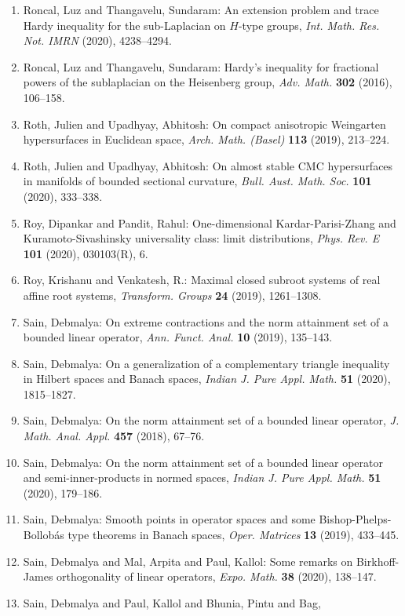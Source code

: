 \begin{enumerate}
\item Roncal, Luz and Thangavelu, Sundaram: An extension problem and trace {H}ardy inequality for the
sub-{L}aplacian on {$H$}-type groups, \emph{Int. Math. Res. Not. IMRN} {\bf } (2020), 4238--4294.
\item Roncal, Luz and Thangavelu, Sundaram: Hardy's inequality for fractional powers of the sublaplacian
on the {H}eisenberg group, \emph{Adv. Math.} {\bf 302} (2016), 106--158.
\item Roth, Julien and Upadhyay, Abhitosh: On compact anisotropic {W}eingarten hypersurfaces in
{E}uclidean space, \emph{Arch. Math. (Basel)} {\bf 113} (2019), 213--224.
\item Roth, Julien and Upadhyay, Abhitosh: On almost stable {CMC} hypersurfaces in manifolds of bounded
sectional curvature, \emph{Bull. Aust. Math. Soc.} {\bf 101} (2020), 333--338.
\item Roy, Dipankar and Pandit, Rahul: One-dimensional {K}ardar-{P}arisi-{Z}hang and
{K}uramoto-{S}ivashinsky universality class: limit
distributions, \emph{Phys. Rev. E} {\bf 101} (2020), 030103(R), 6.
\item Roy, Krishanu and Venkatesh, R.: Maximal closed subroot systems of real affine root systems, \emph{Transform. Groups} {\bf 24} (2019), 1261--1308.
\item Sain, Debmalya: On extreme contractions and the norm attainment set of a
bounded linear operator, \emph{Ann. Funct. Anal.} {\bf 10} (2019), 135--143.
\item Sain, Debmalya: On a generalization of a complementary triangle inequality in
{H}ilbert spaces and {B}anach spaces, \emph{Indian J. Pure Appl. Math.} {\bf 51} (2020), 1815--1827.
\item Sain, Debmalya: On the norm attainment set of a bounded linear operator, \emph{J. Math. Anal. Appl.} {\bf 457} (2018), 67--76.
\item Sain, Debmalya: On the norm attainment set of a bounded linear operator and
semi-inner-products in normed spaces, \emph{Indian J. Pure Appl. Math.} {\bf 51} (2020), 179--186.
\item Sain, Debmalya: Smooth points in operator spaces and some
{B}ishop-{P}helps-{B}ollob\'{a}s type theorems in {B}anach spaces, \emph{Oper. Matrices} {\bf 13} (2019), 433--445.
\item Sain, Debmalya and Mal, Arpita and Paul, Kallol: Some remarks on {B}irkhoff-{J}ames orthogonality of linear
operators, \emph{Expo. Math.} {\bf 38} (2020), 138--147.
\item Sain, Debmalya and Paul, Kallol and Bhunia, Pintu and Bag,

\end{enumerate}
